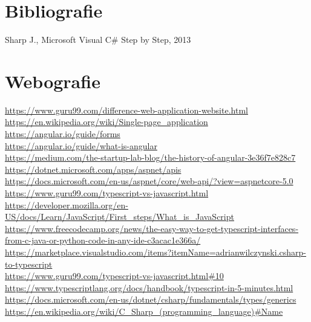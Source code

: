 

\section{Bibliografie}
Sharp J., Microsoft Visual C\# Step by Step, 2013

\section{Webografie}
\url{https://www.guru99.com/difference-web-application-website.html}\\
\url{https://en.wikipedia.org/wiki/Single-page\_application}\\
\url{https://angular.io/guide/forms}\\
\url{https://angular.io/guide/what-is-angular}\\
\url{https://medium.com/the-startup-lab-blog/the-history-of-angular-3e36f7e828c7}\\
\url{https://dotnet.microsoft.com/apps/aspnet/apis}\\
\url{https://docs.microsoft.com/en-us/aspnet/core/web-api/?view=aspnetcore-5.0}\\
\url{https://www.guru99.com/typescript-vs-javascript.html}\\
\url{https://developer.mozilla.org/en-US/docs/Learn/JavaScript/First\_steps/What\_is\_JavaScript}\\
\url{https://www.freecodecamp.org/news/the-easy-way-to-get-typescript-interfaces-from-c-java-or-python-code-in-any-ide-c3acac1e366a/}\\
\url{https://marketplace.visualstudio.com/items?itemName=adrianwilczynski.csharp-to-typescript}\\
\url{https://www.guru99.com/typescript-vs-javascript.html\#10}\\
\url{https://www.typescriptlang.org/docs/handbook/typescript-in-5-minutes.html}\\
\url{https://docs.microsoft.com/en-us/dotnet/csharp/fundamentals/types/generics}\\
\url{https://en.wikipedia.org/wiki/C\_Sharp\_(programming\_language)\#Name}\\
